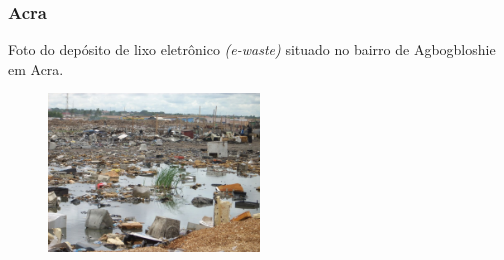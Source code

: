 \begin{frame}
  \frametitle{Acra}
  Foto do depósito de lixo eletrônico \textit{(e-waste)} situado no bairro 
  de Agbogbloshie em Acra.
  \begin{figure}[H]
    \centering
    \includegraphics[width=0.5\textwidth]{../../inputs/images/ewaste_jack_caravano.jpg}
  \end{figure}
\end{frame}


